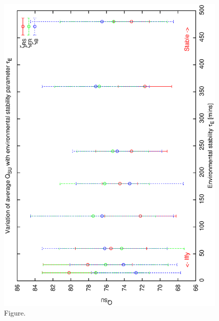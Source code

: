 \documentclass[12pt,a4paper]{article}
\begin{document}
\clearpage
\begin{figure}[htbp]
 \begin{center}
  \includegraphics[scale=1.0, angle=0]{figures/all_de.eps}
 \end{center}
  \caption[Figure.]
{Figure.}
\end{figure}
\clearpage
\end{document}
